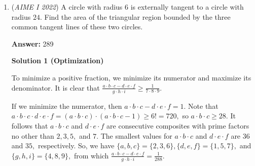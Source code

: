 \begin{enumerate}
 $\textbf{Case 2.2}$: The arithmetic sequence is $4, a, b, 40$.

 Hence, $(a, b) = (16, 28)$.

 $\textbf{Case 2.3}$: The arithmetic sequence is $5, a, b, 50$.

 Hence, $(a, b) = (20, 35)$. However, the sequence $... 20, 35, 30, 40, 50$ is not strictly increasing.

 Putting two cases together, $| C | = 65.$

 Therefore,
 \[| S | - \left( | A | + | B | + | C | \right) = 276 - \left( 31 + 12 + 5 \right) = \boxed{228}.\]




\textbf{Solution 4}

divide cases into $7\leq a<20; 21\leq a\leq28$.(Notice that $a$ can't be equal to $6,20$, that's why I divide them into two parts.There are three cases that arithmetic sequence forms: $3,12,21,30;4,16,28,40;3,5,7,9$.(NOTICE that $5,20,35,50$ IS NOT A VALID SEQUENCE!)So when $7\leq a<20$, there are $10+11+12+...+22-3-13=192$ possible ways( 3 means the arithmetic sequence and 13 means there are 13 "a" s and b cannot be 20)

 When $21\leq a \leq 28$, there are $1+2+\cdots+8=36$ ways.

 In all, there are $192+36=\boxed{228}$ possible sequences.

 


	\item (\textit{AIME I 2022}) A circle with radius $6$ is externally tangent to a circle with radius $24$. Find the area of the triangular region bounded by the three common tangent lines of these two circles.


 
 \textbf{Answer: }289



\textbf{Solution 1 (Optimization)}

To minimize a positive fraction, we minimize its numerator and maximize its denominator. It is clear that $\frac{a \cdot b \cdot c - d \cdot e \cdot f}{g \cdot h \cdot i} \geq \frac{1}{7\cdot8\cdot9}.$

 If we minimize the numerator, then $a \cdot b \cdot c - d \cdot e \cdot f = 1.$ Note that $a \cdot b \cdot c \cdot d \cdot e \cdot f = (a \cdot b \cdot c) \cdot (a \cdot b \cdot c - 1) \geq 6! = 720,$ so $a \cdot b \cdot c \geq 28.$ It follows that $a \cdot b \cdot c$ and $d \cdot e \cdot f$ are consecutive composites with prime factors no other than $2,3,5,$ and $7.$ The smallest values for $a \cdot b \cdot c$ and $d \cdot e \cdot f$ are $36$ and $35,$ respectively. So, we have $\{a,b,c\} = \{2,3,6\}, \{d,e,f\} = \{1,5,7\},$ and $\{g,h,i\} = \{4,8,9\},$ from which $\frac{a \cdot b \cdot c - d \cdot e \cdot f}{g \cdot h \cdot i} = \frac{1}{288}.$


\end{enumerate}
